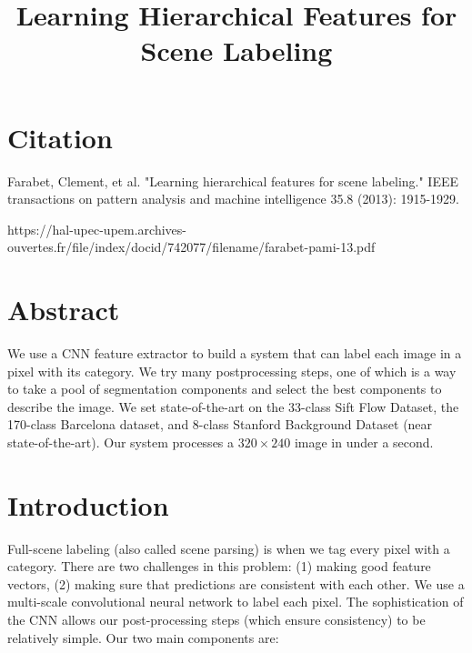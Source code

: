 \documentclass[a4paper]{article}
\title{Learning Hierarchical Features for Scene Labeling}
\date{}
\begin{document}
\maketitle

\section{Citation}
Farabet, Clement, et al. "Learning hierarchical features for scene labeling." IEEE transactions on pattern analysis and machine intelligence 35.8 (2013): 1915-1929.

https://hal-upec-upem.archives-ouvertes.fr/file/index/docid/742077/filename/farabet-pami-13.pdf

\section{Abstract}
We use a CNN feature extractor to build a system that can label each image in
a pixel with its category. We try many postprocessing steps, one of which is a
way to take a pool of segmentation components and select the best components to
describe the image. We set state-of-the-art on the 33-class Sift Flow Dataset,
the 170-class Barcelona dataset, and 8-class Stanford Background Dataset (near
state-of-the-art). Our system processes a $320 \times 240$ image in under a
second.

\section{Introduction}
Full-scene labeling (also called scene parsing) is when we tag every pixel with
a category. There are two challenges in this problem: (1) making good feature
vectors, (2) making sure that predictions are consistent with each other. We
use a multi-scale convolutional neural network to label each pixel. The
sophistication of the CNN allows our post-processing steps (which ensure
consistency) to be relatively simple. Our two main components are:
\end{document}
